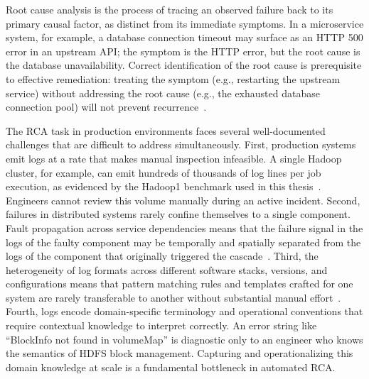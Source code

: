 Root cause analysis is the process of tracing an observed failure back to its primary causal
factor, as distinct from its immediate symptoms. In a microservice system, for example, a
database connection timeout may surface as an HTTP 500 error in an upstream API; the symptom is
the HTTP error, but the root cause is the database unavailability. Correct identification of the
root cause is prerequisite to effective remediation: treating the symptom (e.g., restarting the
upstream service) without addressing the root cause (e.g., the exhausted database connection pool)
will not prevent recurrence~\cite{meng2020localizing,wu2020microrca}.

The RCA task in production environments faces several well-documented challenges that are
difficult to address simultaneously. First, production systems emit logs at a rate that makes
manual inspection infeasible. A single Hadoop cluster, for example, can emit hundreds of thousands
of log lines per job execution, as evidenced by the Hadoop1 benchmark used in this
thesis~\cite{he2020loghub}. Engineers cannot review this volume manually during an active incident.
Second, failures in distributed systems rarely confine themselves to a single component. Fault
propagation across service dependencies means that the failure signal in the logs of the faulty
component may be temporally and spatially separated from the logs of the component that originally
triggered the cascade~\cite{wang2018cloudranger,chen2014causeinfer}. Third, the heterogeneity
of log formats across different software stacks, versions, and configurations means that pattern
matching rules and templates crafted for one system are rarely transferable to another without
substantial manual effort~\cite{zhang2019logrobust}. Fourth, logs encode domain-specific
terminology and operational conventions that require contextual knowledge to interpret correctly.
An error string like ``BlockInfo not found in volumeMap'' is diagnostic only to an engineer who
knows the semantics of HDFS block management. Capturing and operationalizing this domain knowledge
at scale is a fundamental bottleneck in automated RCA.

